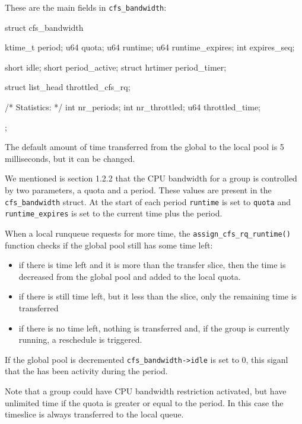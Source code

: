 These are the main fields in \verb|cfs_bandwidth|:
\begin{code}
struct cfs_bandwidth {
	ktime_t			period;
	u64			quota;
	u64			runtime;
	u64			runtime_expires;
	int			expires_seq;
    
    short			idle;
	short			period_active;
	struct hrtimer		period_timer;
	
	struct list_head	throttled_cfs_rq;

	/* Statistics: */
	int			nr_periods;
	int			nr_throttled;
	u64			throttled_time;
};
\end{code}
The default amount of time transferred from the global to the local pool is 5 milliseconds, but it can be changed.

We mentioned is section 1.2.2 that the CPU bandwidth for a group is controlled by two parameters, a quota and a period. These values are present in the \verb|cfs_bandwidth| struct. At the start of each period \verb|runtime| is set to \verb|quota| and \verb|runtime_expires| is set to the current time plus the period.

When a local runqueue requests for more time, the \verb|assign_cfs_rq_runtime()| function checks if the global pool still has some time left:
\begin{itemize}
    \item if there is time left and it is more than the transfer slice, then the time is decreased from the global pool and added to the local quota.
    \item if there is still time left, but it less than the slice, only the remaining time is transferred
    \item if there is no time left, nothing is transferred and, if the group is currently running, a reschedule is triggered.
\end{itemize}
If the global pool is decremented \verb|cfs_bandwidth->idle| is set to 0, this siganl that the has been activity during the period.

Note that a group could have CPU bandwidth restriction activated, but have unlimited time if the quota is greater or equal to the period. In this case the timeslice is always transferred to the local queue.


